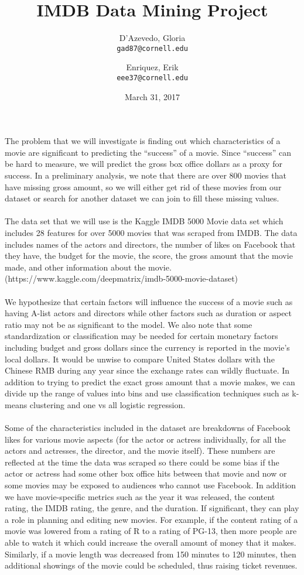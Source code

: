 \documentclass{article}
\title{IMDB Data Mining Project}
\author{
  D'Azevedo, Gloria\\
  \texttt{gad87@cornell.edu}
  \and
  Enriquez, Erik\\
  \texttt{eee37@cornell.edu}
}
\date{March 31, 2017}
\begin{document}
\maketitle

The problem that we will investigate is finding out which characteristics of a movie are significant to predicting the ``success'' of a movie.  Since ``success'' can be hard to measure, we will predict the gross box office dollars as a proxy for success.  In a preliminary analysis, we note that there are over 800 movies that have missing gross amount, so we will either get rid of these movies from our dataset or search for another dataset we can join to fill these missing values.\\
\\
The data set that we will use is the Kaggle IMDB 5000 Movie data set which includes 28 features for over 5000 movies that was scraped from IMDB.  The data includes names of the actors and directors, the number of likes on Facebook that they have, the budget for the movie, the score, the gross amount that the movie made, and other information about the movie. (https://www.kaggle.com/deepmatrix/imdb-5000-movie-dataset) \\
\\
We hypothesize that certain factors will  influence the success of a movie such as having A-list actors and directors while other factors such as duration or aspect ratio may not be as significant to the model.  We also note that some standardization or classification may be needed for certain monetary factors including budget and gross dollars since the currency is reported in the movie's local dollars.  It would be unwise to compare United States dollars with the Chinese RMB during any year since the exchange rates can wildly fluctuate.  In addition to trying to predict the exact gross amount that a movie makes, we can divide up the range of values into bins and use classification techniques such as k-means clustering and one vs all logistic regression. \\
\\
Some of the characteristics included in the dataset are breakdowns of Facebook likes for various movie aspects (for the actor or actress individually, for all the actors and actresses, the director, and the movie itself).  These numbers are reflected at the time the data was scraped so there could be some bias if the actor or actress had some other box office hits between that movie and now or some movies may be exposed to audiences who cannot use Facebook.  In addition we have movie-specific metrics such as the year it was released, the content rating, the IMDB rating, the genre, and the duration.  If significant, they can play a role in planning and editing new movies.  For example, if the content rating of a movie was lowered from a rating of R to a rating of PG-13, then more people are able to watch it which could increase the overall amount of money that it makes.  Similarly, if a movie length was decreased from 150 minutes to 120 minutes, then additional showings of the movie could be scheduled, thus raising ticket revenues.\\
\end{document}
